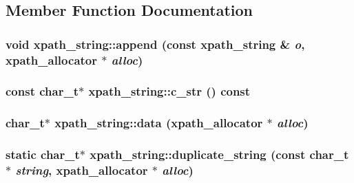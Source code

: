 \subsection{Member Function Documentation}
\hypertarget{classxpath__string_aab0d867c56d390213cf0fbe7334e1cc0}{
\subsubsection[{append}]{\setlength{\rightskip}{0pt plus 5cm}void xpath\_\-string::append (const {\bf xpath\_\-string} \& {\em o}, \/  {\bf xpath\_\-allocator} $\ast$ {\em alloc})}}
\label{classxpath__string_aab0d867c56d390213cf0fbe7334e1cc0}
\hypertarget{classxpath__string_a0c5d08cda063f380e065f87041d20b39}{
\subsubsection[{c\_\-str}]{\setlength{\rightskip}{0pt plus 5cm}const char\_\-t$\ast$ xpath\_\-string::c\_\-str () const}}
\label{classxpath__string_a0c5d08cda063f380e065f87041d20b39}
\hypertarget{classxpath__string_ade42a938746bcba171b70bfb88c3c568}{
\subsubsection[{data}]{\setlength{\rightskip}{0pt plus 5cm}char\_\-t$\ast$ xpath\_\-string::data ({\bf xpath\_\-allocator} $\ast$ {\em alloc})}}
\label{classxpath__string_ade42a938746bcba171b70bfb88c3c568}
\hypertarget{classxpath__string_a8e1458ed23ff94c0c27f8eb96fb26b11}{
\subsubsection[{duplicate\_\-string}]{\setlength{\rightskip}{0pt plus 5cm}static char\_\-t$\ast$ xpath\_\-string::duplicate\_\-string (const char\_\-t $\ast$ {\em string}, \/  {\bf xpath\_\-allocator} $\ast$ {\em alloc})}}
